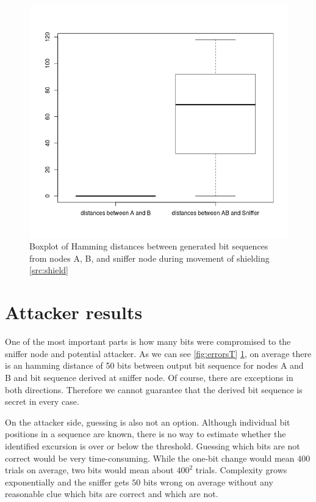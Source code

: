 \documentclass[
  print, %
  Table,   %
  nolof,     %
  nolot,     %
           oneside
]{fithesis3}
\begin{document}
  \begin{figure}
    \includegraphics[width=\textwidth]{../images/boxplotDistancesRottation.png}
  \caption{Boxplot of Hamming distances between generated bit sequences from nodes A, B, and sniffer node during movement of shielding \ref{src:shield}}
  \label{fig:errorsS}
  \end{figure}



\section{Attacker results}

One of the most important parts is how many bits were compromised to the sniffer node and potential attacker. As we can see \ref{fig:errorsT} \ref{fig:errorsS}, on average there is an hamming distance of 50 bits between output bit sequence for nodes A and B and bit sequence derived at sniffer node. Of course, there are exceptions in both directions. Therefore we cannot guarantee that the derived bit sequence is secret in every case.

On the attacker side, guessing is also not an option. Although individual bit positions in a sequence are known, there is no way to estimate whether the identified excursion is over or below the threshold. Guessing which bits are not correct would be very time-consuming. While the one-bit change would mean $400$ trials on average, two bits would mean about $400^2$ trials. Complexity grows exponentially and the sniffer gets $50$ bits wrong on average without any reasonable clue which bits are correct and which are not.
\end{document}
